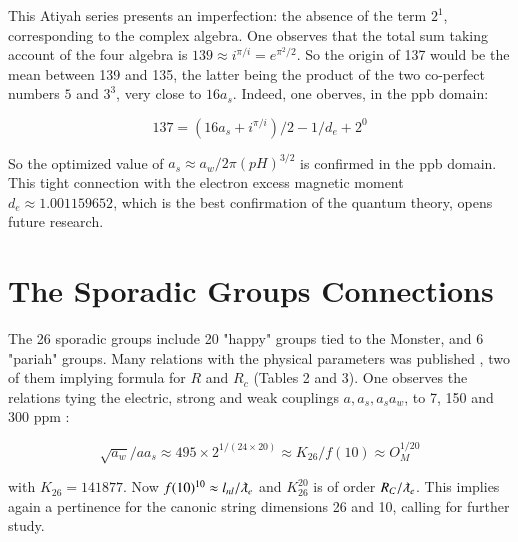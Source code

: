 \documentclass[a4paper,9pt]{article}
\begin{document}
This Atiyah series presents an imperfection: the absence of the term $2^1$, corresponding to the complex algebra. One observes that the total sum taking account of the four algebra is $139 \approx i^{\pi/i} = e^{\pi^2/2}$. So the origin of 137 would be the mean between 139 and 135, the latter being the product of the two co-perfect numbers $5$ and $3^3$, very close to $16a_s$. Indeed, one oberves, in the ppb domain:

 \begin{equation}\label{Eq51}
 137 = (16a_s + i^{\pi/i})/2 - 1/d_e + 2^0
 \end{equation}

So the optimized value of $a_s\approx a_w/2\pi (pH)^{3/2}$ is confirmed in the ppb domain. This tight connection with the electron excess magnetic moment $d_e \approx 1.001159652$, which is the best confirmation of the quantum theory, opens future research.




\section{The Sporadic Groups Connections} 

The 26 sporadic groups include 20 "happy" groups tied to the Monster, and 6 "pariah" groups. Many relations with the physical parameters was published \cite{Sanchez3}, two of them implying formula for $R$ and $R_c$ (Tables 2 and 3). One observes the relations tying the electric, strong and weak couplings $a, a_s,a_s a_w$, to 7, 150 and 300 ppm  : 




\begin{equation}\label{Eq52}
 \sqrt {a_w}/aa_s \approx 495 \times 2^{1/(24\times20)} \approx K_{26}/f(10) \approx O_M^{1/20}    
 \end{equation}

 with $K_{26} = 141877$. Now $f(10)^{10} \approx l_{nl}/\lambdabar_e$ and $K_{26}^{20}$ is of order $R_C/\lambdabar_e$. This implies again a pertinence for the canonic string dimensions 26 and 10, calling for further study.
 
\end{document}
